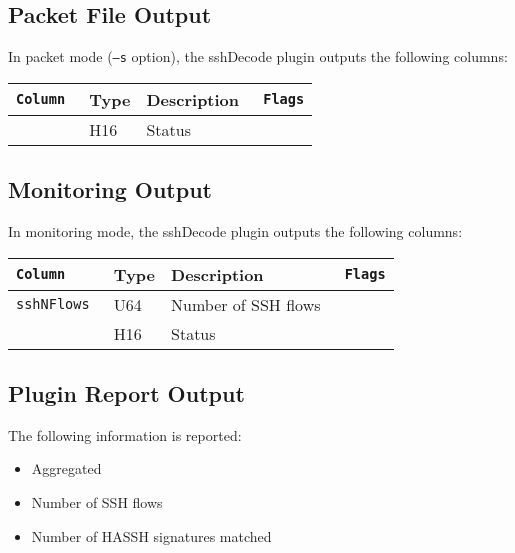 \documentclass[documentation]{subfiles}
\begin{document}
\subsection{Packet File Output}
In packet mode ({\tt --s} option), the sshDecode plugin outputs the following columns:
\begin{longtable}{>{\tt}lll>{\tt\small}l}
    \toprule
    {\bf Column} & {\bf Type} & {\bf Description} & {\bf Flags}\\
    \midrule\endhead%
    \nameref{sshStat} & H16 & Status & \\
    \bottomrule
\end{longtable}

\subsection{Monitoring Output}
In monitoring mode, the sshDecode plugin outputs the following columns:
\begin{longtable}{>{\tt}lll>{\tt\small}l}
    \toprule
    {\bf Column} & {\bf Type} & {\bf Description} & {\bf Flags}\\
    \midrule\endhead%
    sshNFlows         & U64 & Number of SSH flows & \\
    \nameref{sshStat} & H16 & Status              & \\
    \bottomrule
\end{longtable}

\subsection{Plugin Report Output}
The following information is reported:
\begin{itemize}
    \item Aggregated {\tt{}}
    \item Number of SSH flows
    \item Number of HASSH signatures matched
\end{itemize}
\end{document}
